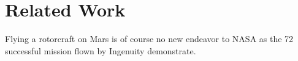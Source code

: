 \chapter{Related Work}
\label{sec:relwork}

Flying a rotorcraft on Mars is of course no new endeavor to NASA as the 72 successful mission flown by Ingenuity demonstrate. 


\citet{Pratt1995SEA}